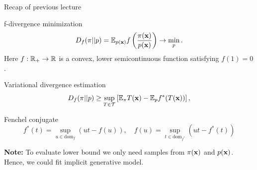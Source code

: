 \begin{frame}{Recap of previous lecture}
	\vspace{-0.3cm}
	\begin{block}{f-divergence minimization}
		\vspace{-0.3cm}
		\[
			D_f(\pi || p) = \mathbb{E}_{p(\mathbf{x})}  f\left( \frac{\pi(\mathbf{x})}{p(\mathbf{x})} \right) \rightarrow \min_p.
		\]
		Here $f: \mathbb{R}_+ \rightarrow \mathbb{R}$ is a convex, lower semicontinuous function satisfying $f(1) = 0$.
	\end{block}
	\begin{block}{Variational divergence estimation}
		\vspace{-0.3cm}
		\[
			D_f(\pi || p) \geq \sup_{T \in \mathcal{T}} \left[\mathbb{E}_{\pi}T(\mathbf{x}) -  \mathbb{E}_p f^*(T(\mathbf{x})) \right],
		\]
		\vspace{-0.7cm}
	\end{block}
	\begin{block}{Fenchel conjugate}
		\vspace{-0.7cm}
		\[
		f^*(t) = \sup_{u \in \text{dom}_f} \left( ut - f(u) \right), \quad f(u) = \sup_{t \in \text{dom}_{f^*}} \left( ut - f^*(t) \right)
		\]
		\vspace{-0.5cm}
	\end{block}
	\textbf{Note:} To evaluate lower bound we only need samples from $\pi(\mathbf{x})$ and $p(\mathbf{x})$. Hence, we could fit implicit generative model.
\end{frame}
